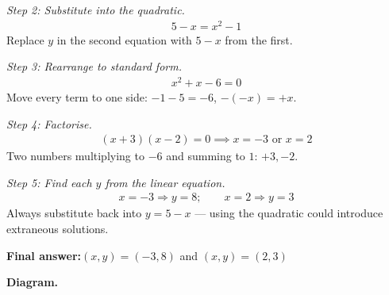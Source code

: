\documentclass[11pt]{article}
\begin{document}
\textit{Step 2: Substitute into the quadratic.}
\[\begin{gathered}
5 - x = x^2 - 1
\end{gathered}\]
Replace \( y \) in the second equation with \( 5 - x \) from the first.

\textit{Step 3: Rearrange to standard form.}
\[\begin{gathered}
x^2 + x - 6 = 0
\end{gathered}\]
Move every term to one side: \( -1 - 5 = -6 \), \( -(-x) = +x \).

\textit{Step 4: Factorise.}
\[\begin{gathered}
(x + 3)(x - 2) = 0 \implies x = -3 \text{ or } x = 2
\end{gathered}\]
Two numbers multiplying to \( -6 \) and summing to \( 1 \): \( +3, -2 \).

\textit{Step 5: Find each \( y \) from the linear equation.}
\[\begin{gathered}
x = -3 \Rightarrow y = 8; \qquad x = 2 \Rightarrow y = 3
\end{gathered}\]
Always substitute back into \( y = 5 - x \) --- using the quadratic could introduce extraneous solutions.

\begin{answerbox}
\textbf{Final answer:}\quad \(\displaystyle (x, y) = (-3, 8)\) and \(\displaystyle (x, y) = (2, 3)\)
\end{answerbox}
\textbf{Diagram.}
\end{document}
